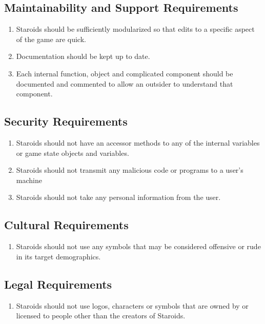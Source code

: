 \documentclass[12pt, titlepage]{article}
\begin{document}
\subsection{Maintainability and Support Requirements}
  \begin{enumerate}
    \item Staroids should be sufficiently modularized so that edits to a specific aspect of the game are quick.
    \item Documentation should be kept up to date.
    \item Each internal function, object and complicated component should be documented and commented to allow an outsider to understand that component.
  \end{enumerate}

\subsection{Security Requirements}
  \begin{enumerate}
    \item Staroids should not have an accessor methods to any of the internal variables or game state objects and variables.
    \item Staroids should not transmit any malicious code or programs to a user's machine
    \item Staroids should not take any personal information from the user.
  \end{enumerate}

\subsection{Cultural Requirements}
  \begin{enumerate}
    \item Staroids should not use any symbols that may be considered offensive or rude in its target demographics.
  \end{enumerate}

\subsection{Legal Requirements}
  \begin{enumerate}
    \item Staroids should not use logos, characters or symbols that are owned by or licensed to people other than the creators of Staroids.
  \end{enumerate}
\end{document}

